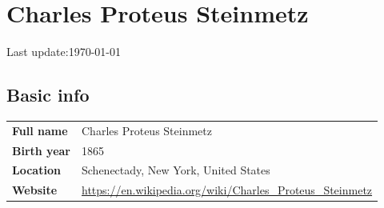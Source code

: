 \documentclass[a4paper]{article}
\newlength{\LASTUPDATESEP}\setlength{\LASTUPDATESEP}{1em}
\begin{document}
\section*{Charles Proteus Steinmetz}
\vspace{1em}
\vspace{\LASTUPDATESEP}
Last update:\@ \today{}%
\vspace{\LASTUPDATESEP}
\subsection*{Basic info}
%
\begin{tabularx}{\textwidth}{@{}lX}
     \textbf{Full name}  & Charles Proteus Steinmetz
  \\ \textbf{Birth year} & 1865
  \\ \textbf{Location}   & Schenectady, New York, United States
  \\ \textbf{Website}    & \url{https://en.wikipedia.org/wiki/Charles_Proteus_Steinmetz}
\end{tabularx}
\end{document}
